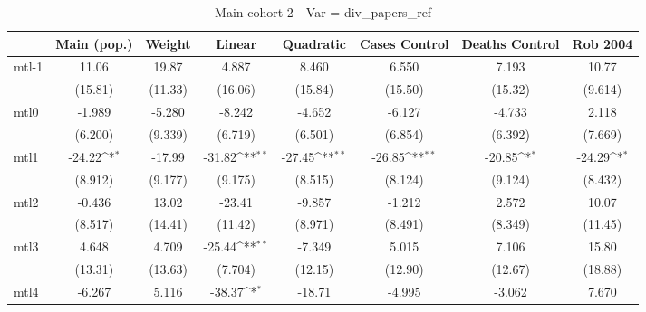 \documentclass{article}
\begin{document}
{
\def\sym#1{\ifmmode^{#1}\else\(^{#1}\)\fi}
\begin{longtable}{l*{7}{c}}
\caption{Main cohort 2 - Var = div\_papers\_ref}\\
\hline\hline\endfirsthead\hline\endhead\hline\endfoot\endlastfoot
                &\multicolumn{1}{c}{Main (pop.)}&\multicolumn{1}{c}{Weight}&\multicolumn{1}{c}{Linear}&\multicolumn{1}{c}{Quadratic}&\multicolumn{1}{c}{Cases Control}&\multicolumn{1}{c}{Deaths Control}&\multicolumn{1}{c}{Rob 2004}\\
\hline
mtl-1           &    11.06         &    19.87         &    4.887         &    8.460         &    6.550         &    7.193         &    10.77         \\
                &  (15.81)         &  (11.33)         &  (16.06)         &  (15.84)         &  (15.50)         &  (15.32)         &  (9.614)         \\
mtl0            &   -1.989         &   -5.280         &   -8.242         &   -4.652         &   -6.127         &   -4.733         &    2.118         \\
                &  (6.200)         &  (9.339)         &  (6.719)         &  (6.501)         &  (6.854)         &  (6.392)         &  (7.669)         \\
mtl1            &   -24.22\sym{*}  &   -17.99         &   -31.82\sym{**} &   -27.45\sym{**} &   -26.85\sym{**} &   -20.85\sym{*}  &   -24.29\sym{*}  \\
                &  (8.912)         &  (9.177)         &  (9.175)         &  (8.515)         &  (8.124)         &  (9.124)         &  (8.432)         \\
mtl2            &   -0.436         &    13.02         &   -23.41         &   -9.857         &   -1.212         &    2.572         &    10.07         \\
                &  (8.517)         &  (14.41)         &  (11.42)         &  (8.971)         &  (8.491)         &  (8.349)         &  (11.45)         \\
mtl3            &    4.648         &    4.709         &   -25.44\sym{**} &   -7.349         &    5.015         &    7.106         &    15.80         \\
                &  (13.31)         &  (13.63)         &  (7.704)         &  (12.15)         &  (12.90)         &  (12.67)         &  (18.88)         \\
mtl4            &   -6.267         &    5.116         &   -38.37\sym{*}  &   -18.71         &   -4.995         &   -3.062         &    7.670         \\

\end{longtable}}
\end{document}

